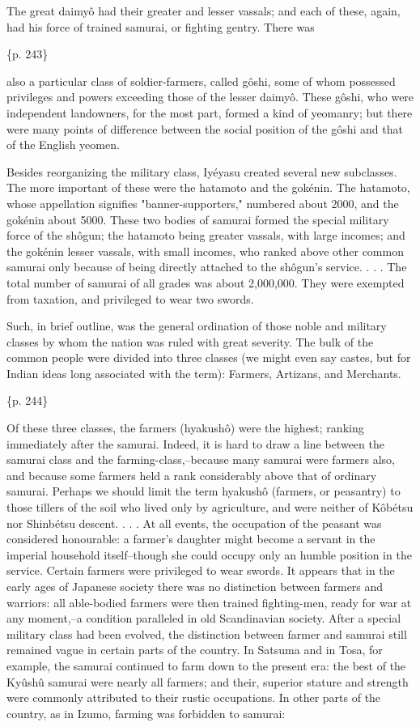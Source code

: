 The great daimyô had their greater and lesser vassals; and each of these, again, had his force of trained samurai, or fighting gentry. There was

\{p. 243\}

also a particular class of soldier-farmers, called gôshi, some of whom possessed privileges and powers exceeding those of the lesser daimyô. These gôshi, who were independent landowners, for the most part, formed a kind of yeomanry; but there were many points of difference between the social position of the gôshi and that of the English yeomen.

Besides reorganizing the military class, Iyéyasu created several new subclasses. The more important of these were the hatamoto and the gokénin. The hatamoto, whose appellation signifies "banner-supporters," numbered about 2000, and the gokénin about 5000. These two bodies of samurai formed the special military force of the shôgun; the hatamoto being greater vassals, with large incomes; and the gokénin lesser vassals, with small incomes, who ranked above other common samurai only because of being directly attached to the shôgun's service. . . . The total number of samurai of all grades was about 2,000,000. They were exempted from taxation, and privileged to wear two swords.



Such, in brief outline, was the general ordination of those noble and military classes by whom the nation was ruled with great severity. The bulk of the common people were divided into three classes (we might even say castes, but for Indian ideas long associated with the term): Farmers, Artizans, and Merchants.

\{p. 244\}

Of these three classes, the farmers (hyakushô) were the highest; ranking immediately after the samurai. Indeed, it is hard to draw a line between the samurai class and the farming-class,--because many samurai were farmers also, and because some farmers held a rank considerably above that of ordinary samurai. Perhaps we should limit the term hyakushô (farmers, or peasantry) to those tillers of the soil who lived only by agriculture, and were neither of Kôbétsu nor Shinbétsu descent. . . . At all events, the occupation of the peasant was considered honourable: a farmer's daughter might become a servant in the imperial household itself--though she could occupy only an humble position in the service. Certain farmers were privileged to wear swords. It appears that in the early ages of Japanese society there was no distinction between farmers and warriors: all able-bodied farmers were then trained fighting-men, ready for war at any moment,--a condition paralleled in old Scandinavian society. After a special military class had been evolved, the distinction between farmer and samurai still remained vague in certain parts of the country. In Satsuma and in Tosa, for example, the samurai continued to farm down to the present era: the best of the Kyûshû samurai were nearly all farmers; and their, superior stature and strength were commonly attributed to their rustic occupations. In other parts of the country, as in Izumo, farming was forbidden to samurai:

